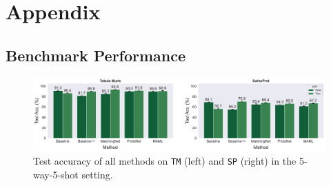 \section{Appendix}

\subsection{Benchmark Performance}

\begin{figure}
    \centering
    \includegraphics[width=0.9\linewidth]{../figures/benchmark-perf.pdf}
    \caption{Test accuracy of all methods on \texttt{TM} (left) and \texttt{SP} (right) in the 5-way-5-shot setting.}
    \label{fig:benchmark-perf}
\end{figure}